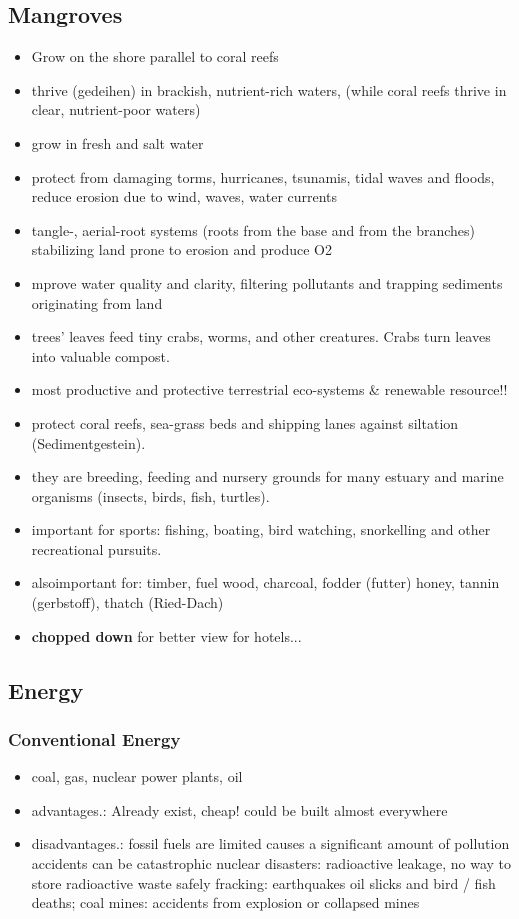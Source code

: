 \documentclass[a5paper,12pt,twoside,titlepage]{scrartcl}
\begin{document}
\subsection{Mangroves}
			\begin{itemize}
			\item Grow on the shore parallel to coral reefs
			\item thrive (gedeihen) in brackish, nutrient-rich waters, (while coral reefs thrive in clear, nutrient-poor waters)
			\item grow in fresh and salt water 
			\item protect from damaging torms, hurricanes, tsunamis, tidal waves and floods, reduce erosion due to wind, waves, water currents 
			\item  tangle-,  aerial-root systems (roots from the base and from the branches) stabilizing land prone to erosion and produce O2
			\item mprove water quality and clarity, filtering pollutants and trapping sediments originating from land
			\item trees' leaves feed tiny crabs, worms, and other creatures. Crabs turn leaves into valuable compost.
			\item most productive and protective terrestrial eco-systems \& renewable resource!!
			\item protect coral reefs, sea-grass beds and shipping lanes against siltation (Sedimentgestein).
			\item they are breeding, feeding and nursery grounds for many estuary and marine organisms (insects, birds, fish, turtles).
			\item important for sports: fishing, boating, bird watching, snorkelling and other recreational pursuits.
			\item alsoimportant for: timber, fuel wood, charcoal, fodder (futter) honey, tannin (gerbstoff), thatch (Ried-Dach)
			\item \textbf{chopped down} for better view for hotels...
			\end{itemize}	

\subsection{Energy}
	\subsubsection{Conventional Energy}
		\begin{itemize} 
			\item coal, gas, nuclear power plants, oil
			\item advantages.:
			\subitem Already exist, cheap! could be built almost everywhere
			\item disadvantages.:
			\subitem fossil fuels are limited
			\subitem causes a significant amount of pollution
			\subitem accidents can be catastrophic 
			\subsubitem nuclear disasters: radioactive leakage, no way to store radioactive waste safely
			\subsubitem fracking: earthquakes
			\subsubitem oil slicks and bird / fish deaths;
			\subsubitem coal mines: accidents from explosion or collapsed mines
		\end{itemize}	
\end{document}
